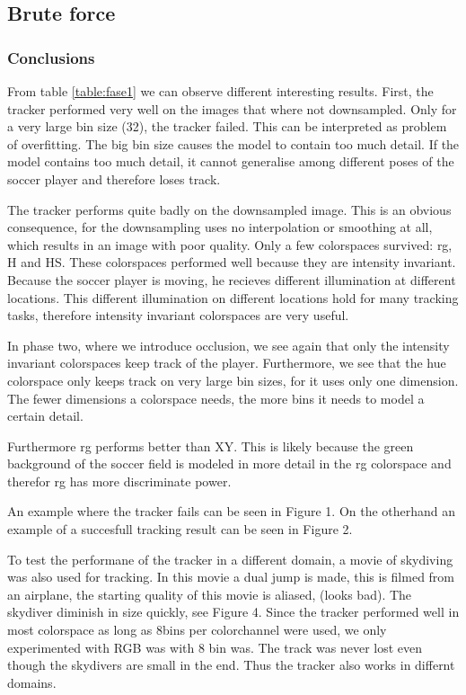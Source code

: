 \documentclass[a4paper,11pt]{article}
\begin{document}
	\subsection{Brute force} 
\subsubsection{Conclusions}
From table \ref{table:fase1} we can observe different interesting results.
First, the tracker performed very well on the images that where not
downsampled. Only for a very large bin size (32), the tracker failed. This can be
interpreted as problem of overfitting. The big bin size causes the model to
contain too much detail. If the model contains too much detail, it cannot
generalise among different poses of the soccer player and therefore loses track.

The tracker performs quite badly on the downsampled image. This is an obvious consequence, for  the downsampling uses no interpolation or smoothing at
all, which results in an image with poor quality. Only a few colorspaces
survived: rg, H and HS. These colorspaces performed well because they are
intensity invariant. Because the soccer player is moving, he recieves different
illumination at different locations. This different illumination on different
locations hold for many tracking tasks, therefore intensity
invariant colorspaces are very useful.

In phase two, where we introduce occlusion, we see again that only the intensity
invariant colorspaces keep track of the player. Furthermore, we see that the hue
colorspace only keeps track on very large bin sizes, for it uses
only one dimension. The fewer dimensions a colorspace needs, the more bins it
needs to model a certain detail.

Furthermore rg performs better than XY. This is likely because the green
background of the soccer field is modeled in more detail in the rg colorspace and
therefor rg has more discriminate power.

An example where the tracker fails can be seen in Figure 1. On the
otherhand an example of a succesfull tracking result can be seen in
Figure 2. 

To test the performane of the tracker in a different domain, a movie of
skydiving was also used for tracking. In this movie a dual jump is made, this is
filmed from an airplane, the starting quality of this movie is aliased, (looks
bad). The skydiver diminish in size quickly, see Figure 4. 
Since the tracker performed well in most colorspace as long as 8bins per
colorchannel were used, we only experimented with RGB was with 8 bin was. The
track was never lost even though the skydivers are small in the end. Thus the
tracker also works in differnt domains. 
\end{document}
